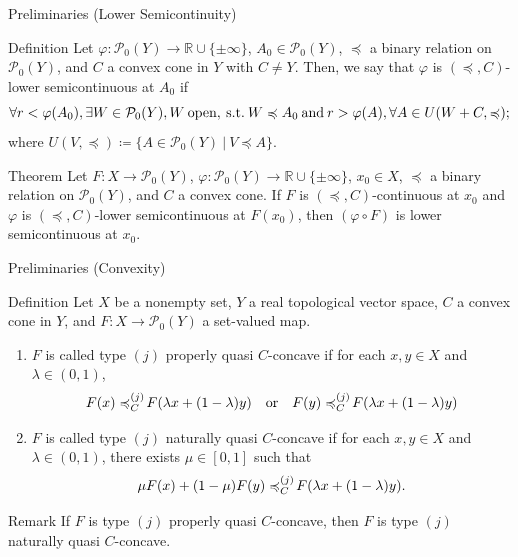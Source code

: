 \documentclass[aspectratio=169, dvipdfmx, 11pt]{beamer}
\newcommand{\RealNumberSet}{\mathbb{R}}
\newcommand{\pow}[1]{\mathcal{P}_{0}(#1)}
\newcommand{\SuchThat}{\:\text{s.t.}\:}
\newcommand{\SetForm}[2]{
  \{{#1}\:|\:{#2}\}
}
\newcommand{\setrel}[2]{\preccurlyeq^{(#1)}_{#2}\!}
\begin{document}
\begin{frame}{Preliminaries (Lower Semicontinuity)}
  \begin{block}{Definition \cite{500001551932}}
    Let $\varphi \colon \pow{Y} \to \RealNumberSet \cup \{\pm \infty\}$, $A_0 \in \pow{Y}$,
    $\preccurlyeq$ a binary relation on $\pow{Y}$, and $C$ a convex cone in $Y$ with $C \ne Y$. Then,
    we say that $\varphi$ is $(\preccurlyeq, C)$-lower semicontinuous at $A_0$ if
    \begin{equation}
      \forall r < \varphi (A_0), \exists W \in \pow{Y}, W\:\text{open}, \SuchThat W \preccurlyeq A_0 \:\text{and}\:
      r > \varphi (A), \forall A \in U(W + C, \preccurlyeq); \notag
    \end{equation}
    where $U(V,\preccurlyeq) \coloneqq \SetForm{A \in \pow{Y}}{V \preccurlyeq A}$.
  \end{block}

  \begin{block}{Theorem \cite{500001551932}}
    Let $F \colon X \to \pow{Y}$, $\varphi \colon \pow{Y} \to \RealNumberSet \cup \{\pm \infty\}$, $x_0 \in X$,
    $\preccurlyeq$ a binary relation on $\pow{Y}$, and $C$ a convex cone. If $F$ is $(\preccurlyeq, C)$-continuous at $x_0$
    and $\varphi$ is $(\preccurlyeq, C)$-lower semicontinuous at $F(x_0)$, then $(\varphi \circ F)$ is lower semicontinuous at $x_0$.
  \end{block}
\end{frame}

\begin{frame}{Preliminaries (Convexity)}
  \begin{block}{Definition}
    Let $X$ be a nonempty set, $Y$ a real topological vector space, $C$ a convex cone in $Y$, and $F\colon X \to \pow{Y}$ a set-valued map.
    \begin{enumerate}
      \item $F$ is called type $(j)$ properly quasi $C$-concave if for each $x,y \in X$ and $\lambda \in (0,1)$,
            \begin{equation}
              F(x) \setrel{j}{C} F(\lambda x + (1-\lambda)y) \quad \text{or} \quad F(y) \setrel{j}{C} F(\lambda x + (1-\lambda)y) \notag
            \end{equation}
      \item $F$ is called type $(j)$ naturally quasi $C$-concave if for each $x,y \in X$ and $\lambda \in (0,1)$, there exists $\mu \in [0,1]$ such that
            \begin{equation}
              \mu F(x) + (1-\mu) F(y) \setrel{j}{C} F(\lambda x + (1-\lambda)y). \notag
            \end{equation}
    \end{enumerate}
  \end{block}
  \begin{alertblock}{Remark}
    If $F$ is type $(j)$ properly quasi $C$-concave,
    then $F$ is type $(j)$ naturally quasi $C$-concave.
  \end{alertblock}
\end{frame}
\end{document}
